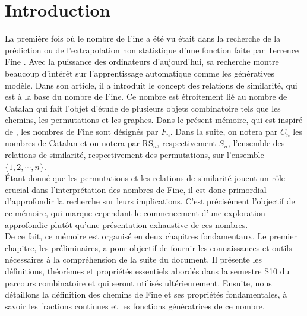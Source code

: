 \section*{Introduction}
\vspace*{20pt}
La première fois où le nombre de Fine a été vu était dans la recherche de la prédiction ou de l'extrapolation non statistique d'une fonction faite par Terrence Fine \cite{TFine}. Avec la puissance des ordinateurs d'aujourd'hui, sa recherche montre beaucoup d'intérêt sur l'apprentissage automatique comme les génératives modèle. Dans son article, il a introduit le concept des relations de similarité, qui est à la base du nombre de Fine.
Ce nombre est étroitement lié au nombre de Catalan qui fait l'objet d'étude de plusieurs objets combinatoire tels que les chemins, les permutations et les graphes. Dans le présent mémoire, qui est inspiré de \cite{RRP}, les nombres de Fine sont désignés par $F_{n}$. Dans la suite, on notera par $C_{n}$ les nombres de Catalan et on notera par $\text{RS}_{n}$, respectivement $S_{n}$, l'ensemble des relations de similarité, respectivement des permutations, sur l'ensemble $\{1, 2, \cdots, n\}$.\vspace{5pt}\\

Étant donné que les permutations et les relations de similarité jouent un rôle crucial dans l'interprétation des nombres de Fine, il est donc primordial d'approfondir la recherche sur leurs implications. C'est précisément l'objectif de ce mémoire, qui marque cependant le commencement d'une exploration approfondie plutôt qu'une présentation exhaustive de ces nombres. \vspace{5pt}\\

De ce fait, ce mémoire est organisé en deux chapitres fondamentaux. Le premier chapitre, les préliminaires, a pour objectif de fournir les connaissances et outils nécessaires à la compréhension de la suite du document. Il présente les définitions, théorèmes et propriétés essentiels abordés dans la semestre S10 du parcours combinatoire et qui seront utilisés ultérieurement. Ensuite, nous détaillons la définition des chemins de Fine et ses propriétés fondamentales, à savoir les fractions continues et les fonctions génératrices de ce nombre. \vspace*{5pt}\\

